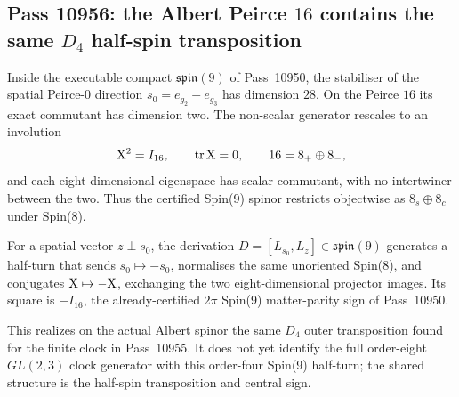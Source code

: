 \subsection{Pass 10956: the Albert Peirce $16$ contains the same $D_4$ half-spin transposition}

Inside the executable compact $\mathfrak{spin}(9)$ of Pass~10950, the
stabiliser of the spatial Peirce-0 direction $s_0=e_{g_2}-e_{g_3}$ has
dimension $28$.  On the Peirce $16$ its exact commutant has dimension two.
The non-scalar generator rescales to an involution
\[
 \mathrm{X}^2=I_{16},\qquad \operatorname{tr}\mathrm{X}=0,
 \qquad 16=8_{+}\oplus8_{-},
\]
and each eight-dimensional eigenspace has scalar commutant, with no
intertwiner between the two.  Thus the certified Spin(9) spinor restricts
objectwise as $8_s\oplus8_c$ under Spin(8).

For a spatial vector $z\perp s_0$, the derivation
$D=[L_{s_0},L_z]\in\mathfrak{spin}(9)$ generates a half-turn that sends
$s_0\mapsto-s_0$, normalises the same unoriented Spin(8), and conjugates
$\mathrm{X}\mapsto-\mathrm{X}$, exchanging the two eight-dimensional projector images.
Its square is $-I_{16}$, the already-certified $2\pi$ Spin(9) matter-parity
sign of Pass~10950.

This realizes on the actual Albert spinor the same $D_4$ outer transposition
found for the finite clock in Pass~10955.  It does not yet identify the full
order-eight $GL(2,3)$ clock generator with this order-four Spin(9) half-turn;
the shared structure is the half-spin transposition and central sign.
